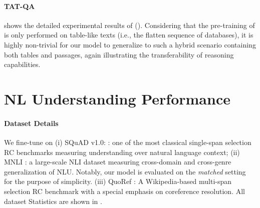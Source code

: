 \paragraph{TAT-QA}

 shows the detailed experimental results of \tagop (\oursroberta). 
Considering that the pre-training of \oursroberta is only performed on table-like texts (i.e., the flatten sequence of databases), it is highly non-trivial for our model to generalize to such a hybrid scenario containing both tables and passages, again illustrating the transferability of reasoning capabilities.


\section{NL Understanding Performance}\label{sec:nl_understnad}

\begin{table}[t]
  \centering
  \small
  \caption{\ours on NL understanding experiment dataset statistics.}
  \label{tab:mrc-stat}\end{table}

\paragraph{Dataset Details} We fine-tune \oursroberta on (i) SQuAD v1.0: \citep{rajpurkar-etal-2016-squad}: one of the most classical single-span selection RC benchmarks measuring understanding over natural language context; (ii) MNLI \citep{williams-etal-2018-broad}: a large-scale NLI dataset measuring cross-domain and cross-genre generalization of NLU. Notably, our model is evaluated on the \textit{matched} setting for the purpose of simplicity. (iii) QuoRef \cite{dasigi-etal-2019-quoref}: A Wikipedia-based multi-span selection RC benchmark with a special emphasis on coreference resolution. All dataset Statistics are shown in .

